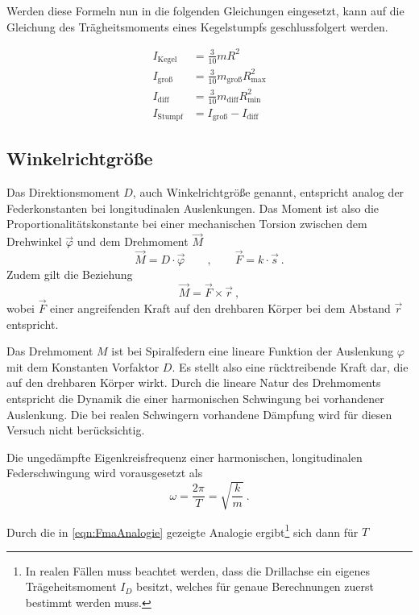 Werden diese Formeln nun in die folgenden Gleichungen eingesetzt, kann auf die Gleichung des Trägheitsmoments eines 
Kegelstumpfs geschlussfolgert werden. 

\begin{align}
    I_\text{Kegel}&=\frac{3}{10}mR^2 \\
    I_\text{groß}&=\frac{3}{10}m_\text{groß}R_\text{max}^2 \\
    I_\text{diff}&=\frac{3}{10}m_\text{diff}R_\text{min}^2 \\
    I_\text{Stumpf}&=I_\text{groß}-I_\text{diff}
\end{align}

\subsection{Winkelrichtgröße}
Das Direktionsmoment $D$, auch Winkelrichtgröße genannt, entspricht analog der Federkonstanten bei longitudinalen Auslenkungen. Das Moment ist also
die Proportionalitätskonstante bei einer mechanischen Torsion zwischen dem Drehwinkel $\vec{\varphi}$ und dem Drehmoment $\vec{M}$
\begin{equation}
    \label{eqn:FederAnalogie}
    \vec{M} = D\cdot \vec{\varphi} \qquad , \qquad \vec{F} = k\cdot \vec{s}\:.
\end{equation}
Zudem gilt die Beziehung 
\begin{equation}
    \label{eqn:DrehKraft}
    \vec{M} = \vec{F} \times \vec{r}\:,
\end{equation}
wobei $\vec{F}$ einer angreifenden Kraft auf den drehbaren Körper bei dem Abstand $\vec{r}$ entspricht.


Das Drehmoment $M$ ist bei Spiralfedern eine lineare Funktion der Auslenkung $\varphi$ mit dem Konstanten Vorfaktor $D$.
Es stellt also eine rücktreibende Kraft dar, die auf den drehbaren Körper wirkt.
Durch die lineare Natur des Drehmoments entspricht die Dynamik die einer harmonischen Schwingung bei vorhandener Auslenkung.
Die bei realen Schwingern vorhandene Dämpfung wird für diesen Versuch nicht berücksichtig.

Die ungedämpfte Eigenkreisfrequenz einer harmonischen, longitudinalen Federschwingung wird vorausgesetzt als 
\begin{equation*}
    \omega = \frac{2\pi}{T} = \sqrt{\frac{k}{m}}\:.
\end{equation*}

Durch die in \eqref{eqn:FmaAnalogie} gezeigte Analogie ergibt\footnote{In realen Fällen muss beachtet werden, dass die Drillachse ein eigenes Trägeheitsmoment $I_D$ besitzt, welches für genaue Berechnungen zuerst bestimmt werden muss.} sich dann für $T$

